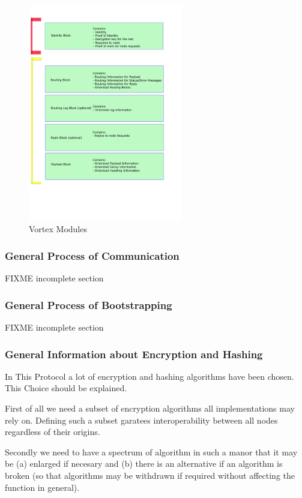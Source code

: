 \begin{figure}[H]
	\centering\includegraphics[width=0.6\textwidth]{inc/parts/PrinciplesOfProtocol.pdf}
	\caption{Vortex Modules}\label{fig:PrinciplesOfProtocol}
\end{figure}


\subsubsection{General Process of Communication}
FIXME incomplete section

\subsubsection{General Process of Bootstrapping}
FIXME incomplete section

\subsubsection{General Information about Encryption and Hashing\label{sec:genEncrypt}}
In This Protocol a lot of encryption and hashing algorithms have been chosen. This Choice should be explained. 

First of all we need a subset of encryption algorithms all implementations may rely on. Defining such a subset garatees interoperability between all nodes regardless of their origins. 

Secondly we need to have a spectrum of algorithm in such a manor that it may be (a) enlarged if necesary and (b) there is an alternative if an algorithm is broken (so that algorithms may be withdrawn if required without affecting the function in general). 

